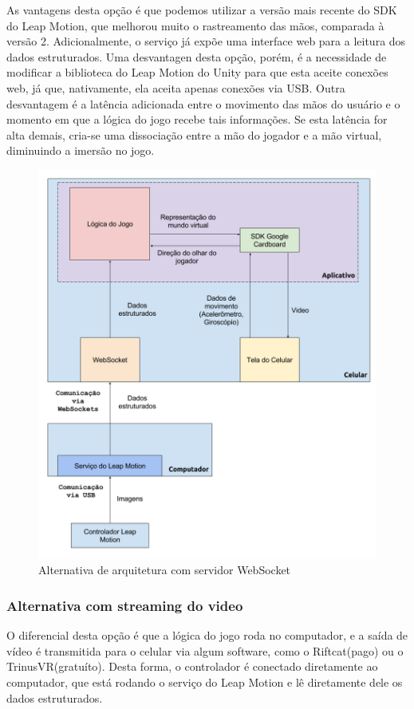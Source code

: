 As vantagens desta opção é que podemos utilizar a versão mais recente do SDK do Leap Motion, que melhorou muito o rastreamento das mãos, comparada à versão 2. Adicionalmente, o serviço já expõe uma interface web para a leitura dos dados estruturados. Uma desvantagen desta opção, porém, é a necessidade de modificar a biblioteca do Leap Motion do Unity para que esta aceite conexões web, já que, nativamente, ela aceita apenas conexões via USB. Outra desvantagem é a latência adicionada entre o movimento das mãos do usuário e o momento em que a lógica do jogo recebe tais informações. Se esta latência for alta demais, cria-se uma dissociação entre a mão do jogador e a mão virtual, diminuindo a imersão no jogo.

\begin{figure}
	\centering
	\includegraphics[width=0.7\linewidth]{images/Arquitetura-leap-pc-leapdata-android}
	\caption{Alternativa de arquitetura com servidor WebSocket}
	\label{fig:arquitetura-leap-pc-leapdata-android}
\end{figure}

\subsubsection{Alternativa com streaming do video}\label{subsubsec-arquiteturas-leapmotion-pc-riftcat-android}

O diferencial desta opção é que a lógica do jogo roda no computador, e a saída de vídeo é transmitida para o celular via algum software, como o Riftcat(pago) ou o TrinusVR(gratuíto). Desta forma, o controlador é conectado diretamente ao computador, que está rodando o serviço do Leap Motion e lê diretamente dele os dados estruturados.

